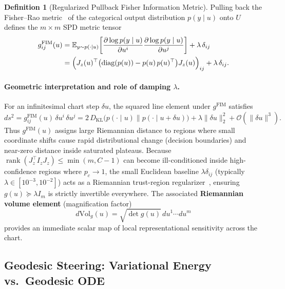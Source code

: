 \documentclass[11pt,a4paper]{article}
\newcommand{\E}{\mathbb{E}}
\newcommand{\DKL}{D_{\mathrm{KL}}}
\DeclareMathOperator{\diag}{diag}
\DeclareMathOperator{\rank}{rank}
\theoremstyle{definition}
\newtheorem{definition}{Definition}[section]
\begin{document}
\begin{definition}[Regularized Pullback Fisher Information Metric]
Pulling back the Fisher--Rao metric~\cite{amari2016infogeom,park2024linear} of the categorical output distribution $p(y \mid u)$ onto $U$ defines the $m \times m$ SPD metric tensor
\begin{align}
    g^{\mathrm{FIM}}_{ij}(u)
    &= \E_{y \sim p(\cdot \mid u)} \!\left[ \frac{\partial \log p(y \mid u)}{\partial u^i} \frac{\partial \log p(y \mid u)}{\partial u^j} \right] + \lambda \, \delta_{ij} \nonumber \\
    &= \Bigl( J_z(u)^\top \bigl(\diag(p(u)) - p(u)\, p(u)^\top\bigr) J_z(u) \Bigr)_{ij} + \lambda \, \delta_{ij}.
    \label{eq:pullback-fisher-metric}
\end{align}
\end{definition}

\paragraph{Geometric interpretation and role of damping $\lambda$.}
For an infinitesimal chart step $\delta u$, the squared line element under $g^{\mathrm{FIM}}$ satisfies
\[
    ds^2 = g^{\mathrm{FIM}}_{ij}(u)\, \delta u^i \, \delta u^j
    = 2 \, \DKL\!\bigl(p(\cdot \mid u) \parallel p(\cdot \mid u + \delta u)\bigr) + \lambda \|\delta u\|_2^2 + \mathcal{O}(\|\delta u\|^3).
\]
Thus $g^{\mathrm{FIM}}(u)$ assigns large Riemannian distance to regions where small coordinate shifts cause rapid distributional change (decision boundaries) and near-zero distance inside saturated plateaus. Because $\rank(J_z^\top I_z J_z) \le \min(m, C-1)$ can become ill-conditioned inside high-confidence regions where $p_c \to 1$, the small Euclidean baseline $\lambda \delta_{ij}$ (typically $\lambda \in [10^{-3}, 10^{-2}]$) acts as a Riemannian trust-region regularizer~\cite{arvanitidis2018oddity}, ensuring $g(u) \succeq \lambda I_m$ is strictly invertible everywhere. The associated \textbf{Riemannian volume element} (magnification factor)
\begin{equation}
    d\mathrm{Vol}_g(u) = \sqrt{\det g(u)} \, du^1 \cdots du^m
    \label{eq:volume-element}
\end{equation}
provides an immediate scalar map of local representational sensitivity across the chart.

\subsection{Geodesic Steering: Variational Energy vs.\ Geodesic ODE}
\end{document}
